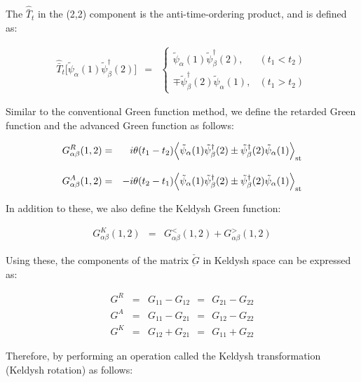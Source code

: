 \documentclass[uplatex,a4j,12pt,dvipdfmx]{jsarticle}
\begin{document}
The $\hat{\bar{T}}_{t}$ in the (2,2) component is the anti-time-ordering product, and is defined as:

\begin{eqnarray}
	\hat{\bar{T}}_{t}
	\Big[ \tilde{\psi}_{\alpha}(1) \tilde{\psi}_{\beta}^{\dagger}(2) \Big]
	&=&
	\left\{
	\begin{array}{ll}
		\tilde{\psi}_{\alpha}(1) \tilde{\psi}_{\beta}^{\dagger}(2),     & (t_{1} < t_{2})
		\\[3mm]
		\mp \tilde{\psi}_{\beta}^{\dagger}(2) \tilde{\psi}_{\alpha}(1), & (t_{1} > t_{2})
	\end{array}
	\right.
\end{eqnarray}

Similar to the conventional Green function method, we define the retarded Green function and the advanced Green function as follows:

\begin{eqnarray}
	G^{R}_{\alpha \beta}(1,2)
	&=&
	i \theta( t_{1} - t_{2} ) \Big\langle \tilde{\psi}_{\alpha}(1) \tilde{\psi}_{\beta}^{\dagger}(2) \pm \tilde{\psi}_{\beta}^{\dagger}(2) \tilde{\psi}_{\alpha}(1) \Big\rangle_{\rm st}
	\\[3mm]
	G^{A}_{\alpha \beta}(1,2)
	&=&
	- i \theta( t_{2} - t_{1} ) \Big\langle \tilde{\psi}_{\alpha}(1) \tilde{\psi}_{\beta}^{\dagger}(2) \pm \tilde{\psi}_{\beta}^{\dagger}(2) \tilde{\psi}_{\alpha}(1) \Big\rangle_{\rm st}
\end{eqnarray}

In addition to these, we also define the Keldysh Green function:

\begin{eqnarray}
	G^{K}_{\alpha \beta}(1,2)
	&=&
	G^{<}_{\alpha \beta}(1,2)
	+
	G^{>}_{\alpha \beta}(1,2)
	\label{eqn:keldyshg}
\end{eqnarray}

Using these, the components of the matrix $\check{\underbar{G}}$ in Keldysh space can be expressed as:

\begin{eqnarray}
	G^{R}
	&=&
	G_{11} - G_{12}
	\ \ = \ \
	G_{21} - G_{22}
	\\[1mm]
	G^{A}
	&=&
	G_{11} - G_{21}
	\ \ = \ \
	G_{12} - G_{22}
	\\[1mm]
	G^{K}
	&=&
	G_{12} + G_{21}
	\ \ = \ \
	G_{11} + G_{22}
\end{eqnarray}

Therefore, by performing an operation called the Keldysh transformation (Keldysh rotation) as follows:
\end{document}
